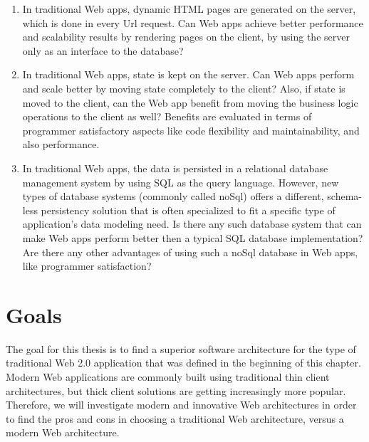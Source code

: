 \begin{enumerate}
\item{} In traditional Web apps, dynamic HTML pages are generated on the server, which is done in every Url request. Can Web apps achieve better performance and scalability results by rendering pages on the client, by using the server only as an interface to the database? 
\item{} In traditional Web apps, state is kept on the server. Can Web apps perform and scale better by moving state completely to the client? Also, if state is moved to the client, can the Web app benefit from moving the  business logic operations to the client as well? Benefits are evaluated in terms of programmer satisfactory aspects like code flexibility and maintainability, and also performance. 
\item{} In traditional Web apps, the data is persisted in a relational database management system by using SQL as the query language. However, new types of database systems (commonly called noSql) offers a different, schema-less persistency solution that is often specialized to fit a specific type of application's data modeling need. Is there any such database system that can make Web apps perform better then a typical SQL database implementation? Are there any other advantages of using such a noSql database in Web apps, like programmer satisfaction? 
\end{enumerate}

		
\section{Goals}


The goal for this thesis is to find a superior software architecture for the type of traditional Web 2.0 application that was defined in the beginning of this chapter. Modern Web applications are commonly built using traditional thin client architectures, but thick client solutions are getting increasingly more popular. Therefore, we will investigate modern and   innovative Web architectures in order to find the pros and cons in choosing a traditional Web architecture, versus a modern Web architecture. 
	
